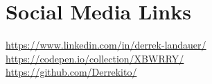 \section*{Social Media Links}
{\Large \faLinkedin}\hspace{12pt}\href{https://www.linkedin.com/in/derrek-landauer/}{ https://www.linkedin.com/in/derrek-landauer/}\\
{\Large \faCodepen}\hspace{10pt}\href{https://codepen.io/collection/XBWRRY/}{https://codepen.io/collection/XBWRRY/}\\
{\Large \faGithub}\hspace{12pt}\href{https://github.com/Derrekito/}{https://github.com/Derrekito/}
